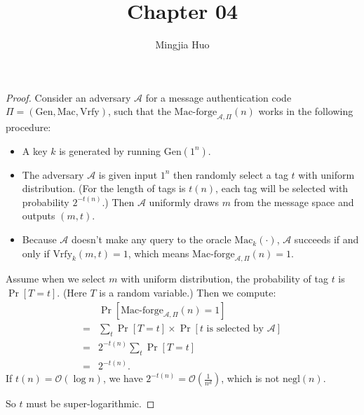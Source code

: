 \documentclass[12pt]{article}
\newcommand{\negl}{\text{negl}}
\newcommand{\Gen}{\text{Gen}}
\newcommand{\Mac}{\text{Mac}}
\newcommand{\Vrfy}{\text{Vrfy}}
\newcommand{\A}{\mathcal{A}}
\newenvironment{problem}[2][Problem]{\begin{trivlist}
\item[\hskip \labelsep {\bfseries #1}\hskip \labelsep {\bfseries #2.}]}{\end{trivlist}}
\begin{document}
 
 
\title{Chapter 04}
\author{Mingjia Huo}
\maketitle

\begin{problem}{4.1}
\begin{proof}
Consider an adversary $\A$ for a message authentication code $\Pi=(\Gen,\Mac,\Vrfy)$, such that the $\text{Mac-forge}_{\A,\Pi}(n)$ works in the following procedure:
\begin{itemize}
    \item A key $k$ is generated by running $\Gen(1^n)$.
    \item The adversary $\A$ is given input $1^n$ then randomly select a tag $t$ with uniform distribution. (For the length of tags is $t(n)$, each tag will be selected with probability $2^{-t(n)}$.) Then $\A$ uniformly draws $m$ from the message space and outputs $(m,t)$.
    \item Because $\A$ doesn't make any query to the oracle $\Mac_k(\cdot)$, $\A$ succeeds if and only if $\Vrfy_k
(m,t)=1$, which means $\text{Mac-forge}_{\A,\Pi}(n)=1$. 
\end{itemize}
Assume when we select $m$ with uniform distribution, the probability of tag $t$ is $\Pr[T=t]$. (Here $T$ is a random variable.) Then we compute:
\begin{align*}
    &\Pr[\text{Mac-forge}_{\A,\Pi}(n)=1]\\
    =&\sum_{t}\Pr[T=t]\times\Pr[t\text{ is selected by }\A]\\
    =&2^{-t(n)}\sum_t\Pr[T=t]\\
    =&2^{-t(n)}.
\end{align*}
If $t(n)=\mathcal{O}(\log n)$, we have $2^{-t(n)}=\mathcal{O}(\frac{1}{n^d})$, which is not $\negl(n)$. \par
So $t$ must be super-logarithmic.
\end{proof}
\end{problem}
\end{document}
